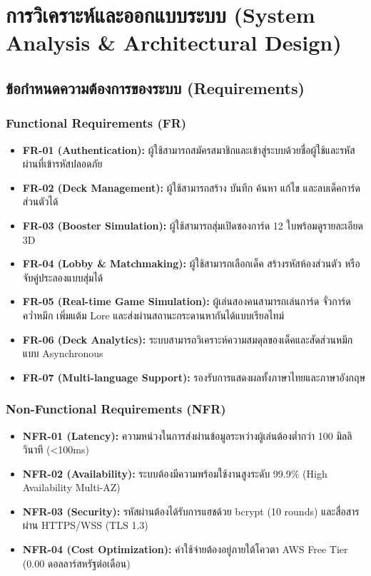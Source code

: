 \documentclass[12pt,a4paper]{report}
\begin{document}
\chapter{การวิเคราะห์และออกแบบระบบ (System Analysis \& Architectural Design)}

\section{ข้อกำหนดความต้องการของระบบ (Requirements)}
\subsection{Functional Requirements (FR)}
\begin{itemize}
    \item \textbf{FR-01 (Authentication):} ผู้ใช้สามารถสมัครสมาชิกและเข้าสู่ระบบด้วยชื่อผู้ใช้และรหัสผ่านที่เข้ารหัสปลอดภัย
    \item \textbf{FR-02 (Deck Management):} ผู้ใช้สามารถสร้าง บันทึก ค้นหา แก้ไข และลบเด็คการ์ดส่วนตัวได้
    \item \textbf{FR-03 (Booster Simulation):} ผู้ใช้สามารถสุ่มเปิดซองการ์ด 12 ใบพร้อมดูรายละเอียด 3D
    \item \textbf{FR-04 (Lobby \& Matchmaking):} ผู้ใช้สามารถเลือกเด็ค สร้างรหัสห้องส่วนตัว หรือจับคู่ประลองแบบสุ่มได้
    \item \textbf{FR-05 (Real-time Game Simulation):} ผู้เล่นสองคนสามารถเล่นการ์ด จั่วการ์ด คว่ำหมึก เพิ่มแต้ม Lore และส่งผ่านสถานะกระดานหากันได้แบบเรียลไทม์
    \item \textbf{FR-06 (Deck Analytics):} ระบบสามารถวิเคราะห์ความสมดุลของเด็คและสัดส่วนหมึกแบบ Asynchronous
    \item \textbf{FR-07 (Multi-language Support):} รองรับการแสดงผลทั้งภาษาไทยและภาษาอังกฤษ
\end{itemize}

\subsection{Non-Functional Requirements (NFR)}
\begin{itemize}
    \item \textbf{NFR-01 (Latency):} ความหน่วงในการส่งผ่านข้อมูลระหว่างผู้เล่นต้องต่ำกว่า 100 มิลลิวินาที (<100ms)
    \item \textbf{NFR-02 (Availability):} ระบบต้องมีความพร้อมใช้งานสูงระดับ 99.9\% (High Availability Multi-AZ)
    \item \textbf{NFR-03 (Security):} รหัสผ่านต้องได้รับการแฮชด้วย bcrypt (10 rounds) และสื่อสารผ่าน HTTPS/WSS (TLS 1.3)
    \item \textbf{NFR-04 (Cost Optimization):} ค่าใช้จ่ายต้องอยู่ภายใต้โควตา AWS Free Tier (0.00 ดอลลาร์สหรัฐต่อเดือน)
\end{itemize}
\end{document}
